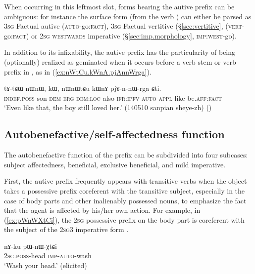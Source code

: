 When occurring in this leftmost slot, forms bearing the autive prefix can be ambiguous: for instance the surface form  (from the verb ) can either be parsed as \textsc{3sg} Factual autive  (\textsc{auto}-go:\textsc{fact}), \textsc{3sg} Factual vertitive (§\ref{sec:vertitive}, (\textsc{vert}-go:\textsc{fact}) or \textsc{2sg} \textsc{westwards} imperative (§\ref{sec:imp.morphology}, \textsc{imp}:\textsc{west}-go).

In addition to its infixability, the autive prefix has the particularity of being (optionally) realized as geminated  when it occurs before a verb stem or verb prefix in , as in (\ref{ex:nWtCu.kWnA.pjAnnWrga}).

\begin{exe}
\ex \label{ex:nWtCu.kWnA.pjAnnWrga}
\gll  tɤ-tɕɯ nɯnɯ, kɯ, nɯnɯtɕu kɯnɤ pjɤ-n-nɯ-rga ɕti. \\
\textsc{indef}.\textsc{poss}-son \textsc{dem} \textsc{erg} \textsc{dem}:\textsc{loc} also \textsc{ifr}:\textsc{ipfv}-\textsc{auto}-\textsc{appl}-like be.\textsc{aff}:\textsc{fact} \\
\glt `Even like that, the boy still loved her.' (140510 sanpian sheye-zh) ()
\end{exe}

\subsection{Autobenefactive/self-affectedness function}  \label{sec:autoben.proper}
The autobenefactive function of the  prefix can be subdivided into four subcases: subject affectedness, beneficial, exclusive beneficial, and mild imperative.

First, the autive prefix frequently appears with transitive verbs when the object takes a possessive prefix coreferent with the transitive subject, especially in the case of body parts and other inalienably possessed nouns, to emphasize the fact that the agent is affected by his/her own action. For example, in (\ref{ex:pWnWXtCi}), the \textsc{2sg} possessive prefix on the body part  is coreferent with the subject of the 2\textsc{sg}\fl{}3 imperative form .

\begin{exe}
\ex \label{ex:pWnWXtCi}
\gll  nɤ-ku pɯ-nɯ-χtɕi  \\
\textsc{2sg}.\textsc{poss}-head \textsc{imp}-\textsc{auto}-wash \\
\glt `Wash your head.' (elicited)
\end{exe}

